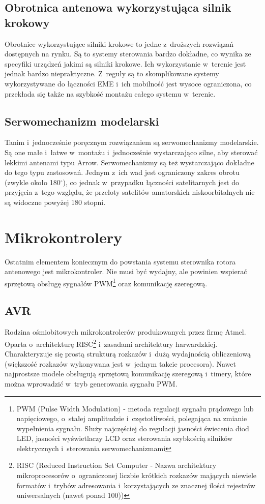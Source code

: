 \documentclass[eng,oneside]{mgr}
\begin{document}
			\subsection{Obrotnica antenowa wykorzystująca silnik krokowy}
			Obrotnice wykorzystujące silniki krokowe to jedne z~droższych rozwiązań dostępnych na rynku. Są to systemy sterowania bardzo dokładne, co wynika ze specyfiki urządzeń jakimi są silniki krokowe. Ich wykorzystanie w~terenie jest jednak bardzo niepraktyczne. Z~reguły są to skomplikowane systemy wykorzystywane do łączności EME i~ich mobilność jest wysoce ograniczona, co przekłada się także na szybkość montażu całego systemu w~terenie.

			\subsection{Serwomechanizm modelarski}
			Tanim i~jednocześnie poręcznym rozwiązaniem są serwomechanizmy modelarskie. Są one małe i~łatwe w~montażu i~jednocześnie wystarczająco silne, aby sterować lekkimi antenami typu Arrow. Serwomechanizmy są też wystarczająco dokładne do tego typu zastosowań. Jednym z~ich wad jest ograniczony zakres obrotu (zwykle około 180$^{\circ}$), co jednak w~przypadku łączności satelitarnych jest do przyjęcia z~tego względu, że przeloty satelitów amatorskich niskoorbitalnych nie są widoczne powyżej 180 stopni.
		
		\section{Mikrokontrolery}
		Ostatnim elementem koniecznym do powstania systemu sterownika rotora antenowego jest mikrokontroler. Nie musi być wydajny, ale powinien wspierać sprzętową obsługę sygnałów PWM\footnote{PWM (Pulse Width Modulation) - metoda regulacji sygnału prądowego lub napięciowego, o~stałej amplitudzie i~częstotliwości, polegająca na zmianie wypełnienia sygnału. Służy najczęściej do regulacji jasności świecenia diod LED, jasności wyświetlaczy LCD oraz sterowania szybkością silników elektrycznych i~sterowania serwomechanizmami} oraz komunikację szeregową. 

			\subsection{AVR}
			Rodzina ośmiobitowych mikrokontrolerów produkowanych przez firmę Atmel. Oparta o~architekturę RISC\footnote{RISC (Reduced Instruction Set Computer - Nazwa architektury mikroprocesorów o~ograniczonej liczbie krótkich rozkazów mających niewiele formatów i~trybów adresowania i~korzystających ze znacznej ilości rejestrów uniwersalnych (nawet ponad 100))} i~zasadami architektury harwardzkiej. Charakteryzuje się prostą strukturą rozkazów i~dużą wydajnością obliczeniową (większość rozkazów wykonywana jest w~jednym takcie procesora). Nawet najprostsze modele obsługują sprzętową komunikację szeregową i~timery, które można wprowadzić w~tryb generowania sygnału PWM.
\end{document}
